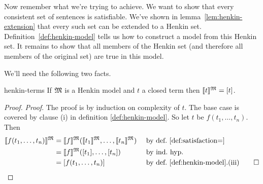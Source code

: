 Now remember what we're trying to achieve.
We want to show that
every consistent set of sentences is satisfiable.
We've shown in lemma~\ref{lem:henkin-extension} that
every such set can be extended to a Henkin set.
Definition~\ref{def:henkin-model} tells us
how to construct a model from this Henkin set.
It remains to show that
all members of the Henkin set
(and therefore all members of the original set)
are true in this model.

We'll need the following two facts.

\begin{lemma}{}{henkin-terms}
  If $\mathfrak{M}$ is a Henkin model and $t$ a closed term then
  $\llbracket t \rrbracket^{\mathfrak{M}} = [t]$.
\end{lemma}
\begin{proof}
  \emph{Proof}.
  The proof is by induction on complexity of $t$.
  The base case is covered by clause (i) in definition \ref{def:henkin-model}.
  So let $t$ be $f(t_{1},\ldots,t_{n})$.
  Then
  \begin{align*}
    \llbracket f(t_{1},\ldots,t_{n})\rrbracket^{\Mod{M}} &= \llbracket f\rrbracket^{\Mod{M}}(\llbracket t_{1}\rrbracket^{\Mod{M}},\ldots,\llbracket t_{n}\rrbracket^{\Mod{M}}) &&\text{ by def.\ \ref{def:satisfaction=}}\\
                               &= \llbracket f\rrbracket^{\Mod{M}}([t_{1}],\ldots,[t_{n}]) &&\text{ by ind.\ hyp.}\\
                               &= [f(t_{1},\ldots,t_{n})] &&\text{ by def.~\ref{def:henkin-model}.(iii)} \qed
  \end{align*}
\end{proof}

